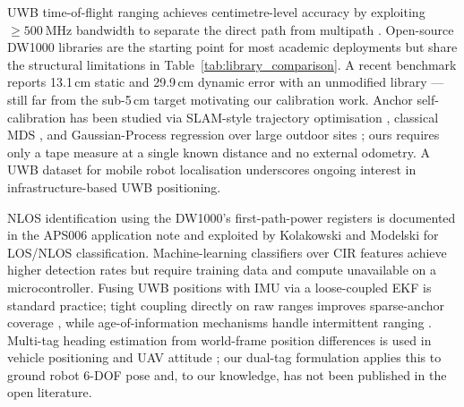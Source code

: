 
UWB time-of-flight ranging achieves centimetre-level accuracy by exploiting
$\geq\SI{500}{\mega\hertz}$ bandwidth to separate the direct path from
multipath \cite{alarifi2016uwb}.
Open-source DW1000 libraries \cite{thotro_dw1000} are the starting point for
most academic deployments but share the structural limitations in
Table~\ref{tab:library_comparison}.
A recent benchmark  reports 13.1\,cm static and
29.9\,cm dynamic error with an unmodified library --- still far from the
sub-5\,cm target motivating our calibration work.
Anchor self-calibration has been studied via SLAM-style trajectory optimisation
\cite{tiemann2017atlas}, classical MDS \cite{torgerson1952mds}, and
Gaussian-Process regression over large outdoor sites \cite{yuan2025uwbgp};
ours requires only a tape measure at a single known distance and no external
odometry.
A UWB dataset for mobile robot localisation \cite{zhao2024util} underscores
ongoing interest in infrastructure-based UWB positioning.

NLOS identification using the DW1000's first-path-power registers is
documented in the APS006 application note \cite{aps006} and exploited by
Kolakowski and Modelski \cite{kolakowski2017nlos} for LOS/NLOS classification.
Machine-learning classifiers over CIR features achieve higher detection rates
 but require training data and compute
unavailable on a microcontroller.
Fusing UWB positions with IMU via a loose-coupled EKF is standard practice;
tight coupling directly on raw ranges improves sparse-anchor coverage
\cite{jiang2024robust}, while age-of-information mechanisms handle intermittent
ranging \cite{aoi_fusionnet_2026}.
Multi-tag heading estimation from world-frame position differences is used in
vehicle positioning  and UAV attitude
\cite{dualanchor_uav_2025}; our dual-tag formulation applies this to ground
robot 6-DOF pose and, to our knowledge, has not been published in the
open literature.
